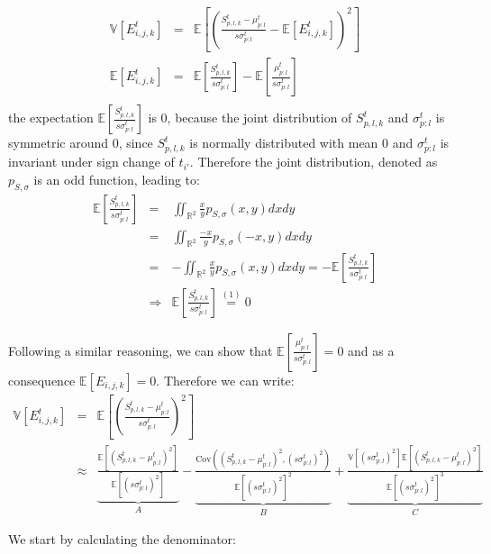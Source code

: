 \documentclass[12pt,a4paper]{article}
\newcommand{\segsum}[3]{S_{#1,#2,#3}^t} %
\newcommand{\subsmean}[2]{\mu^t_{#1:#2}} %
\newcommand{\subsvar}[2]{\sigma^t_{#1:#2}} %
\newcommand{\expectation}[1]{\mathbb{E}\left[#1\right]} %
\newcommand{\variance}[1]{\mathbb{V}\left[#1\right]} %
\newcommand{\covariance}[2]{\text{Cov}(#1,#2)} %
\newcommand{\envelope}[4]{E_{#1,#2,#3}^{#4}} %
\newcommand{\envelopeijkt}{\envelope{i}{j}{k}{t}} %
\newcommand{\segsumplk}{\segsum{p}{l}{k}} %
\newcommand{\subsmeanpl}{\subsmean{p}{l}} %
\newcommand{\subsvarpl}{\subsvar{p}{l}} %
\begin{document}
$$
\begin{array}{rcl}
    \variance{\envelopeijkt} & = & \expectation{\left(\frac{\segsumplk-\subsmeanpl}{s\subsvarpl}-\expectation{\envelopeijkt}\right)^2} \\[16pt]
    \expectation{\envelopeijkt} & = & \expectation{\frac{\segsumplk}{s\subsvarpl}} - \expectation{\frac{\subsmeanpl}{s\subsvarpl}} \\[16pt]
\end{array}
$$
the expectation $\expectation{\frac{\segsumplk}{s\subsvarpl}}$ is $0$, because the joint distribution of $\segsumplk$ and $\subsvarpl$ is symmetric around $0$, since $\segsumplk$ is normally distributed with mean $0$ and $\subsvarpl$ is invariant under sign change of $t_{i'}$. Therefore the joint distribution, denoted as $p_{S,\sigma}$ is an odd function, leading to:
$$
\begin{array}{rcl}
    \expectation{\frac{\segsumplk}{s\subsvarpl}} & = & \iint_{\mathbb{R}^2}\frac{x}{y}p_{S,\sigma}(x,y)dxdy \\[8pt]
    & = & \iint_{\mathbb{R}^2}\frac{-x}{y}p_{S,\sigma}(-x,y)dxdy \\[8pt]
    & = & -\iint_{\mathbb{R}^2}\frac{x}{y}p_{S,\sigma}(x,y)dxdy = -\expectation{\frac{\segsumplk}{s\subsvarpl}} \\[12pt]
    & \Rightarrow & \expectation{\frac{\segsumplk}{s\subsvarpl}} \overset{(1)}{=} 0
\end{array}
$$

Following a similar reasoning, we can show that $\mathbb{E}\left[\frac{\mu_{p:l}^t}{s\sigma_{p:l}^t}\right]=0$ and as a consequence $\mathbb{E}[E_{i,j,k}]=0$. Therefore we can write:
$$
\begin{array}{rcl}
    \variance{\envelopeijkt} & = & \expectation{\left(\frac{\segsumplk-\subsmeanpl}{s\subsvarpl}\right)^2} \\[20pt]
    & \approx & \underbrace{\frac{\expectation{(\segsumplk-\subsmeanpl)^2}}{\expectation{(s\subsvarpl)^2}}}_{A} - \underbrace{\frac{\covariance{(\segsumplk-\subsmeanpl)^2}{(s\subsvarpl)^2}}{\expectation{(s\subsvarpl)^2}^2}}_{B} + \underbrace{\frac{\variance{(s\subsvarpl)^2}\expectation{(\segsumplk-\subsmeanpl)^2}}{\expectation{(s\subsvarpl)^2}^3}}_{C}
\end{array}
$$

We start by calculating the denominator:
\end{document}
